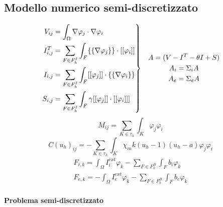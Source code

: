 \documentclass[a4paper]{article}
\theoremstyle{definition}
\newenvironment{rcases}
{\left.\begin{aligned}}
	{\end{aligned}\right\rbrace}
\begin{document}
\vspace{5mm}

\subsection{Modello numerico semi-discretizzato}

\vspace{5mm}
\begin{equation}
\begin{rcases}
V_{ij} &= \int_{\Omega}\nabla\varphi_j \cdot \nabla \varphi_i 
\\ I_{i,j}^T &= \sum_{F \in F_h^I} \int_{F} \{\{\nabla\varphi_j\}\} \cdot [[\varphi_i]] 
\\ I_{i,j} &= \sum_{F \in F_h^I} \int_{F} [[\varphi_j]] \cdot \{\{\nabla \varphi_i\}\}
\\S_{i,j} &= \sum_{F \in F_h^I} \int_{F} \gamma [[\varphi_j]] \cdot [[\varphi_i]]]
\end{rcases}
\begin{gathered}
\quad A = (V -I^T - \theta I + S)\\
\quad A_i = \Sigma_iA \\
\quad A_e = \Sigma_eA
\end{gathered}
\end{equation}
\begin{equation}
M_{ij} = \sum_{K \in \tau_h}\int_K
\varphi_j\varphi_i
\end{equation}
\begin{equation}
C(u_h)_{ij} = - \sum_{K \in \tau_h} \int_K \chi_m k(u_h-1)(u_h-a)\varphi_j\varphi_i
\end{equation}
\begin{equation}
\begin{gathered}
F_{i,k} = \int_{\Omega} I_i^{ext}\varphi_k - \sum_{F \in F_h^B} \int_F b_i\varphi_k
\\
F_{e,k} = - \int_{\Omega} I_e^{ext}\varphi_k - \sum_{F \in F_h^B} \int_F b_e\varphi_k
\end{gathered}
\end{equation}


	\vspace{3mm}
\paragraph{Problema semi-discretizzato} 
\end{document}
